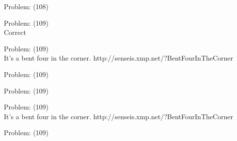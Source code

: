 \documentclass[11pt]{article}
\begin{document}
\begin{minipage}[t]{0.5\textwidth}
  {\centering
  
  Problem: (108)\\
  
  }
\end{minipage}
\begin{minipage}[t]{0.5\textwidth}
  {\centering
  
  Problem: (109)\\
  Correct\\
  }
\end{minipage}
\begin{minipage}[t]{0.5\textwidth}
  {\centering
  
  Problem: (109)\\
  It's a bent four in the corner. 
http://senseis.xmp.net/?BentFourInTheCorner\\
  }
\end{minipage}
\begin{minipage}[t]{0.5\textwidth}
  {\centering
  
  Problem: (109)\\
  
  }
\end{minipage}
\begin{minipage}[t]{0.5\textwidth}
  {\centering
  
  Problem: (109)\\
  
  }
\end{minipage}
\begin{minipage}[t]{0.5\textwidth}
  {\centering
  
  Problem: (109)\\
  It's a bent four in the corner. 
http://senseis.xmp.net/?BentFourInTheCorner\\
  }
\end{minipage}
\begin{minipage}[t]{0.5\textwidth}
  {\centering
  
  Problem: (109)\\
  
  }
\end{minipage}
\end{document}
